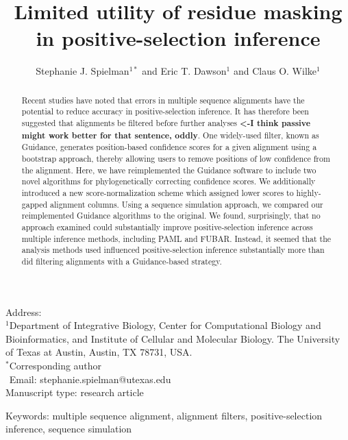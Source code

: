 \documentclass[10pt]{article}
\begin{document}
\title{\textbf{Limited utility of residue masking in positive-selection inference}}
\author{Stephanie J. Spielman$^{1*}$ and Eric T. Dawson$^{1}$ and Claus O. Wilke$^{1}$}
\date{}

\maketitle
\noindent
Address:\\
$^1$Department of Integrative Biology, Center for Computational Biology and Bioinformatics, and Institute of Cellular and Molecular Biology.
The University of Texas at Austin, Austin, TX 78731, USA.\\

\bigskip
\noindent
$^*$Corresponding author\\
$\phantom{^*}$Email: stephanie.spielman@utexas.edu\\

\bigskip
\noindent
Manuscript type: research article

\bigskip
\noindent Keywords: multiple sequence alignment, alignment filters, positive-selection inference, sequence simulation

\newpag
\begin{abstract}
 Recent studies have noted that errors in multiple sequence alignments have the potential to reduce accuracy in positive-selection inference. It has therefore been suggested that alignments be filtered before further analyses \textbf{ <-I think passive might work better for that sentence, oddly}. One widely-used filter, known as Guidance, generates position-based confidence scores for a given alignment using a bootstrap approach, thereby allowing users to remove positions of low confidence from the alignment. Here, we have reimplemented the Guidance software to include two novel algorithms for phylogenetically correcting confidence scores. We additionally introduced a new score-normalization scheme which assigned lower scores to highly-gapped alignment columns. Using a sequence simulation approach, we compared our reimplemented Guidance algorithms to the original. We found, surprisingly, that no approach examined could substantially improve positive-selection inference across multiple inference methods, including PAML and FUBAR. Instead, it seemed that the analysis methods used influenced positive-selection inference substantially more than did filtering alignments with a Guidance-based strategy.
\end{abstract}
\end{document}
